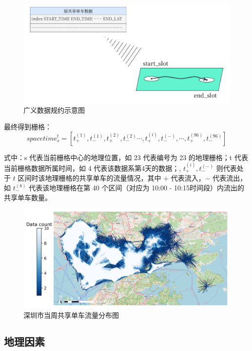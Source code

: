 \documentclass[12pt,a4paper,oneside]{ctexart}
\begin{document}
\begin{figure}
    \centering
    \includegraphics[width=\linewidth]{Figs/转化.pdf}
    \caption{广义数据规约示意图}
    \label{fig:trans}
\end{figure}

最终得到栅格：
\begin{equation}
    spacetime_{s}^{t} = \left[t_+^{(1)},t_-^{(1)},t_+^{(2)},t_-^{(2)} \cdots,t_+^{(i)}, t_-^{(-)} ,\cdots,t_+^{(96)},t_{-}^{(96)}\right]
\end{equation}

式中：s 代表当前栅格中心的地理位置，如 23 代表编号为 23 的地理栅格；t 代表当前栅格数据所属时间，如 4 代表该数据系第4天的数据；, $t_+^{(i)}, t_-^{(-)}$ 则代表处于 $t$ 区间时该地理栅格的共享单车的流量情况，其中 $+$ 代表流入，$-$ 代表流出，如 $t_{-}^{(8)}$ 代表该地理栅格在第 40 个区间（对应为 10:00 - 10:15时间段）内流出的共享单车数量。


\begin{figure}[H]
    \centering
    \includegraphics[width= \linewidth]{Figs/栅格流量图.png}
    \caption{深圳市当周共享单车流量分布图}
    \label{fig:流量}
\end{figure}

\subsection{地理因素}
\end{document}
